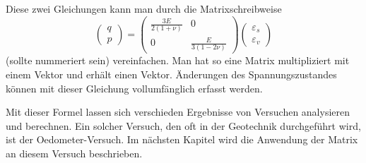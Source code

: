 Diese zwei Gleichungen kann man durch die Matrixschreibweise
\[
\begin{pmatrix}
	q\\
	p
\end{pmatrix}
=
\begin{pmatrix}
	\frac{3E}{2(1+\nu)} &                   0 \\
	                  0 & \frac{E}{3(1-2\nu)}
\end{pmatrix}
\begin{pmatrix}
	\varepsilon_{s}\\
	\varepsilon_{v}
\end{pmatrix}
\]
(sollte nummeriert sein) vereinfachen.
Man hat so eine Matrix multipliziert mit einem Vektor und erhält einen Vektor.
Änderungen des Spannungszustandes können mit dieser Gleichung vollumfänglich erfasst werden.

Mit dieser Formel lassen sich verschieden Ergebnisse von Versuchen analysieren und berechnen.
Ein solcher Versuch, den oft in der Geotechnik durchgeführt wird, ist der Oedometer-Versuch.
Im nächsten Kapitel wird die Anwendung der Matrix an diesem Versuch beschrieben.
